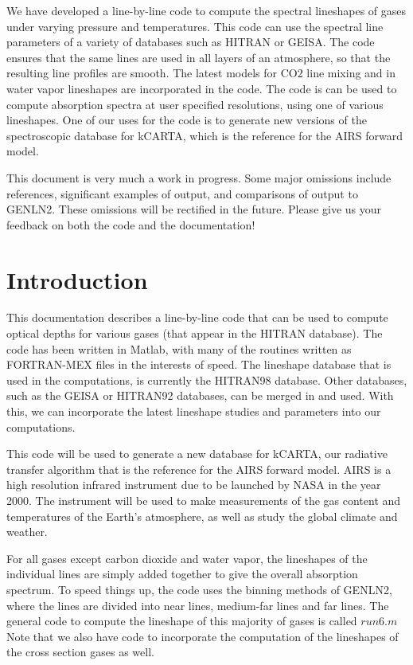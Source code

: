 \documentclass[11pt]{article}
\begin{document}
  We have developed a line-by-line code to compute the spectral lineshapes
  of gases under varying pressure and temperatures. This code can use the
  spectral line parameters of a variety of databases such as HITRAN or 
  GEISA. 
  The code ensures that the same lines are used in all layers of an
  atmosphere, so that the resulting line profiles are smooth. The latest
  models for CO2 line mixing and in water vapor lineshapes are incorporated
  in the code. The code is can be used to compute absorption spectra
  at user specified resolutions, using one of various lineshapes.
  One of our uses for the code is to generate new versions of the 
  spectroscopic database for kCARTA, which is the reference for the AIRS
  forward model.

This document is very much a work in progress.  Some major omissions
include references, significant examples of output, and comparisons of 
output to GENLN2.  These omissions will
be rectified in the future.  Please give us your feedback on both the
code and the documentation!  


\newpage

\section{Introduction}
This documentation describes a line-by-line code that can be used to 
compute optical depths for various gases (that appear in the HITRAN 
database). The code has been written in Matlab, with many of the routines 
written as FORTRAN-MEX files in the interests of speed. The lineshape 
database that is used in the computations, is currently the HITRAN98 
database. Other databases, such as the GEISA or HITRAN92 databases, can be 
merged in and used. With this, we can incorporate the latest lineshape 
studies and parameters into our computations. 

This code will be used to generate a new database for kCARTA, our radiative
transfer algorithm that is the reference for the AIRS forward model. AIRS is
a high resolution infrared instrument due to be launched by NASA in the 
year 2000. The instrument will be used to make measurements of the gas 
content and temperatures of the Earth's atmosphere, as well as study the 
global climate and weather. 

For all gases except carbon dioxide and water vapor, the lineshapes of the
individual lines are simply added together to give the overall absorption
spectrum. To speed things up, the code uses the binning methods of GENLN2, 
where the lines are divided into near lines, medium-far lines and far 
lines. The general code to compute the lineshape of this majority of gases 
is called $run6.m$ Note that we also have code to incorporate the 
computation of the lineshapes of the cross section gases as well.
\end{document}
